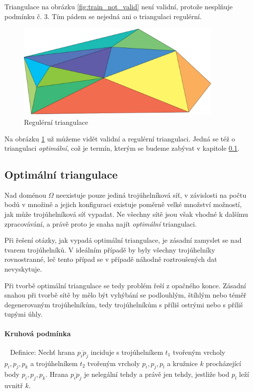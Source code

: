 \documentclass[12pt,a4paper]{article}
\begin{document}
\newpage

Triangulace na obrázku \ref{fig:train_not_valid} není validní, protože
nesplňuje podmínku č. 3. Tím pádem se nejedná ani o triangulaci
regulérní.

\begin{figure}[h!]
\centering
\includegraphics[width=0.9\textwidth]{img/triangulation.png}
\caption{Regulérní triangulace}
\label{fig:triangulace}
\end{figure}

Na obrázku \ref{fig:triangulace} už můžeme vidět validní a regulérní
triangulaci. Jedná se též o triangulaci \emph{optimální}, což je
termín, kterým se budeme zabývat v kapitole \ref{subsec:Optim_trian}.

\newpage
\subsection{Optimální triangulace}
\label{subsec:Optim_trian}

Nad doménou $\Omega$ neexistuje pouze jediná trojúhelníková síť, v
závislosti na počtu bodů v množině a jejich konfiguraci existuje
poměrně velké množství možností, jak může trojúhelníková síť
vypadat. Ne všechny sítě jsou však vhodné k dalšímu zpracovávání, a
právě proto je snaha najít \emph{optimální} triangulaci.

Při řešení otázky, jak vypadá optimální triangulace, je zásadní
zamyslet se nad tvarem trojúhelníků. V ideálním případě by byly
všechny trojúhelníky rovnostranné, leč tento případ se v případě
náhodně roztroušených dat nevyskytuje.

Při tvorbě optimální triangulace se tedy problém řeší z opačného
konce. Zásadní snahou při tvorbě sítě by mělo být vyhýbání se
podlouhlým, štíhlým nebo téměř degenerovaným trojúhelníkům, tedy
trojúhelníkům s příliš ostrými nebo s příliš tupými úhly.

\paragraph{Kruhová podmínka}
~\newline
Definice: Nechť hrana $\overline{p_ip_j}$ inciduje s trojúhelníkem
$t_1$ tvořeným vrcholy $p_i,p_j,p_k$ a trojúhelníkem $t_2$ tvořeným
vrcholy $p_i,p_j,p_l$ a kružnice $k$ procházející body
$p_i,p_j,p_k$. Hrana $\overline{p_ip_j}$ je nelegální tehdy a právě
jen tehdy, jestliže bod $p_l$ leží uvnitř $k$.
\end{document}
